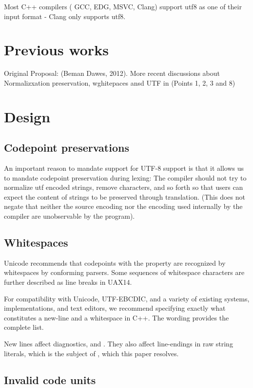 \documentclass{wg21}
\begin{document}
Most C++ compilers ( GCC, EDG, MSVC, Clang) support utf8 as one of their input format - Clang only supports utf8.

\section{Previous works}

Original Proposal:  (Beman Dawes, 2012).
More recent discussions about Normalizxation preservation, wghitepaces ansd UTF in  (Points 1, 2, 3 and 8)

\section{Design}

\subsection{Codepoint preservations}

An important reason to mandate support for UTF-8 support is that it allows us to mandate codepoint preservation during lexing:
The compiler should not try to normalize utf encoded strings, remove characters, and so forth so that users can expect the content
of strings to be preserved through translation.
(This does not negate that neither the source encoding nor the encoding used internally by the compiler are unobservable by the program).

\subsection{Whitespaces}

Unicode recommends that codepoints with the  property are recognized by
whitespaces by conforming parsers.
Some sequences of whitespace characters are further described as line breaks in UAX14.

For compatibility with Unicode, UTF-EBCDIC, and a variety of existing systems, implementations, and text editors,
we recommend specifying exactly what constitutes a new-line and a whitespace in C++.
The wording provides the complete list.

New lines affect diagnostics,  and .
They also affect line-endings in raw string literals, which is the subject of , which this paper resolves.

\subsection{Invalid code units}
\end{document}
